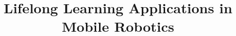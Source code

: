 \documentclass{aamas2016}
\begin{document}


\title{{\color{red} Lifelong Learning Applications in Mobile Robotics} }




%
%
%
%

%

\end{document}
